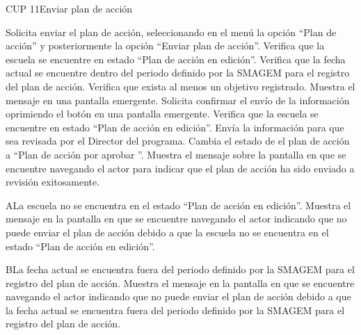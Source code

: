 \begin{UseCase}{CUP 11}{Enviar plan de acción}

	
\end{UseCase}
  \begin{UCtrayectoria}
    \UCpaso[\UCactor] Solicita enviar el plan de acción, seleccionando en el menú  la opción ``Plan de acción'' y posteriormente la opción ``Enviar plan de acción''. 
	\UCpaso[\UCsist] Verifica que la escuela se encuentre en  estado ``Plan de acción en edición''. 
    \UCpaso[\UCsist] Verifica que la fecha actual se encuentre dentro del periodo definido por la SMAGEM para el registro del plan de acción. 
    \UCpaso[\UCsist] Verifica que exista al menos un objetivo registrado. 
    \UCpaso[\UCsist] Muestra el mensaje  en una pantalla emergente.
    \UCpaso[\UCactor] Solicita confirmar el envío de la información oprimiendo el botón  en una pantalla emergente.  
	\UCpaso[\UCsist] Verifica que la escuela se encuentre en  estado ``Plan de acción en edición''. 
    \UCpaso[\UCsist] Envía la información para que sea revisada por el Director del programa.
    \UCpaso[\UCsist] Cambia el estado de el plan de acción a ``Plan de acción por aprobar ''.
    \UCpaso[\UCsist] Muestra el mensaje  sobre la pantalla en que se encuentre navegando el actor para indicar que el plan de acción ha sido enviado a revisión exitosamente.
 \end{UCtrayectoria}
 
\begin{UCtrayectoriaA}{A}{La escuela no se encuentra en el estado ``Plan de acción en edición''.}
    \UCpaso[\UCsist] Muestra el mensaje  en la pantalla en que se encuentre navegando el actor indicando que no puede enviar el plan de acción debido a que la escuela no se encuentra en el estado ``Plan de acción en edición''. 
 \end{UCtrayectoriaA}
 
   \begin{UCtrayectoriaA}{B}{La fecha actual se encuentra fuera del periodo definido por la SMAGEM para el registro del plan de acción.}
    \UCpaso[\UCsist] Muestra el mensaje  en la pantalla en que se encuentre navegando el actor indicando que no puede enviar el plan de acción debido a que la fecha actual se encuentra fuera del periodo definido por la SMAGEM para el registro del plan de acción.
 \end{UCtrayectoriaA}
 
